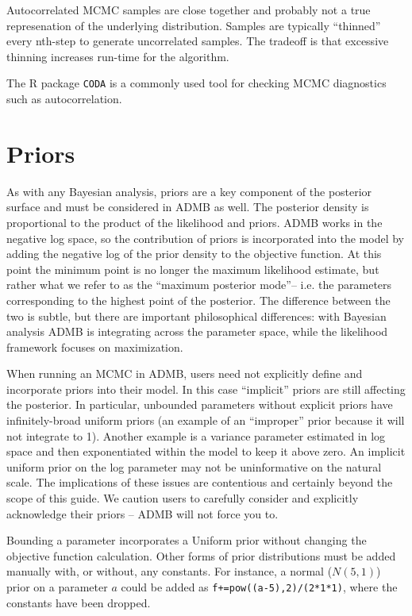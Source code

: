 \documentclass{article}\usepackage[]{graphicx}\usepackage[]{color}
\begin{document}
Autocorrelated MCMC samples are close together and probably
not a true represenation of the underlying
distribution. Samples are typically ``thinned'' every
nth-step to generate uncorrelated samples. The tradeoff is
that excessive thinning increases run-time for the
algorithm.

The R package \texttt{CODA} is a commonly used tool for
checking MCMC diagnostics such as autocorrelation.

\section{Priors}
As with any Bayesian analysis, priors are a key component of
the posterior surface and must be considered in ADMB as
well. The posterior density is proportional to the product
of the likelihood and priors. ADMB works in the negative log
space, so the contribution of priors is incorporated into the
model by adding the negative log of the prior density to the
objective function. At this point the minimum point is no
longer the maximum likelihood estimate, but rather what we
refer to as the ``maximum posterior mode''-- i.e. the
parameters corresponding to the highest point of the
posterior. The difference between the two is subtle, but
there are important philosophical differences: with Bayesian
analysis ADMB is integrating across the parameter space,
while the likelihood framework focuses on maximization.

When running an MCMC in ADMB, users need not explicitly define
and incorporate priors into their model. In this case
``implicit'' priors are still affecting the posterior. In
particular, unbounded parameters without explicit priors
have infinitely-broad uniform priors (an example of an
``improper'' prior because it will not integrate to
1). Another example is a variance parameter estimated in log
space and then exponentiated within the model to keep it
above zero. An implicit uniform prior on the log parameter
may not be uninformative on the natural scale. The
implications of these issues are contentious and certainly
beyond the scope of this guide. We caution users to
carefully consider and explicitly acknowledge their priors
-- ADMB will not force you to.

Bounding a parameter incorporates a Uniform prior without 
changing the objective function calculation. Other forms of 
prior distributions must be added manually with,
or without, any constants. For instance, a normal ($N(5,1)$) 
prior on a parameter $a$ could be added as
\texttt{f+=pow((a-5),2)/(2*1*1)}, where the constants have
been dropped.
\end{document}
